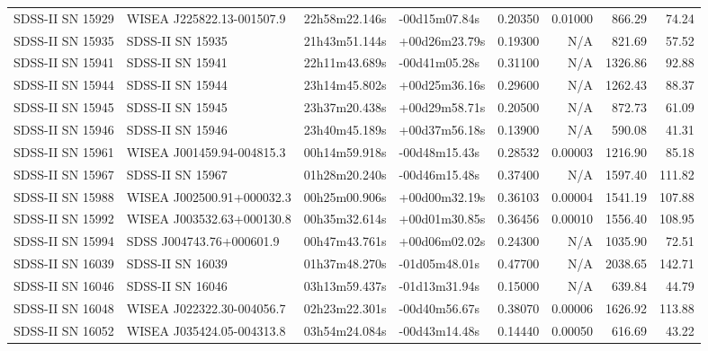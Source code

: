 \begin{longtable}{llllrrrr}
SDSS-II SN 15929 &       WISEA J225822.13-001507.9 &   22h58m22.146s &   -00d15m07.84s &  0.20350 &  0.01000 &   866.29 &       74.24 \\
SDSS-II SN 15935 &                SDSS-II SN 15935 &   21h43m51.144s &   +00d26m23.79s &  0.19300 &      N/A &   821.69 &       57.52 \\
SDSS-II SN 15941 &                SDSS-II SN 15941 &   22h11m43.689s &   -00d41m05.28s &  0.31100 &      N/A &  1326.86 &       92.88 \\
SDSS-II SN 15944 &                SDSS-II SN 15944 &   23h14m45.802s &   +00d25m36.16s &  0.29600 &      N/A &  1262.43 &       88.37 \\
SDSS-II SN 15945 &                SDSS-II SN 15945 &   23h37m20.438s &   +00d29m58.71s &  0.20500 &      N/A &   872.73 &       61.09 \\
SDSS-II SN 15946 &                SDSS-II SN 15946 &   23h40m45.189s &   +00d37m56.18s &  0.13900 &      N/A &   590.08 &       41.31 \\
SDSS-II SN 15961 &       WISEA J001459.94-004815.3 &   00h14m59.918s &   -00d48m15.43s &  0.28532 &  0.00003 &  1216.90 &       85.18 \\
SDSS-II SN 15967 &                SDSS-II SN 15967 &   01h28m20.240s &   -00d46m15.48s &  0.37400 &      N/A &  1597.40 &      111.82 \\
SDSS-II SN 15988 &       WISEA J002500.91+000032.3 &   00h25m00.906s &   +00d00m32.19s &  0.36103 &  0.00004 &  1541.19 &      107.88 \\
SDSS-II SN 15992 &       WISEA J003532.63+000130.8 &   00h35m32.614s &   +00d01m30.85s &  0.36456 &  0.00010 &  1556.40 &      108.95 \\
SDSS-II SN 15994 &        SDSS J004743.76+000601.9 &   00h47m43.761s &   +00d06m02.02s &  0.24300 &      N/A &  1035.90 &       72.51 \\
SDSS-II SN 16039 &                SDSS-II SN 16039 &   01h37m48.270s &   -01d05m48.01s &  0.47700 &      N/A &  2038.65 &      142.71 \\
SDSS-II SN 16046 &                SDSS-II SN 16046 &   03h13m59.437s &   -01d13m31.94s &  0.15000 &      N/A &   639.84 &       44.79 \\
SDSS-II SN 16048 &       WISEA J022322.30-004056.7 &   02h23m22.301s &   -00d40m56.67s &  0.38070 &  0.00006 &  1626.92 &      113.88 \\
SDSS-II SN 16052 &       WISEA J035424.05-004313.8 &   03h54m24.084s &   -00d43m14.48s &  0.14440 &  0.00050 &   616.69 &       43.22 \\

\end{longtable}
